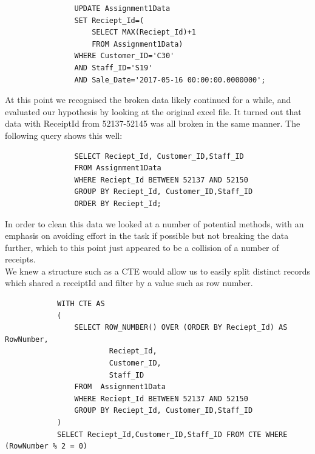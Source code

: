 \documentclass{article}
\begin{document}
            \begin{lstlisting}
                UPDATE Assignment1Data 
                SET Reciept_Id=(
                    SELECT MAX(Reciept_Id)+1 
                    FROM Assignment1Data) 
                WHERE Customer_ID='C30' 
                AND Staff_ID='S19' 
                AND Sale_Date='2017-05-16 00:00:00.0000000';
            \end{lstlisting}

            At this point we recognised the broken data likely continued for a while, and 
            evaluated our hypothesis by looking at the original excel file. It turned
            out that data with ReceiptId from 52137-52145 was all broken in the same manner.
            The following query shows this well:

            \begin{lstlisting}
                SELECT Reciept_Id, Customer_ID,Staff_ID 
                FROM Assignment1Data 
                WHERE Reciept_Id BETWEEN 52137 AND 52150
                GROUP BY Reciept_Id, Customer_ID,Staff_ID 
                ORDER BY Reciept_Id;
            \end{lstlisting}

            In order to clean this data we looked at a number of potential methods, with an 
            emphasis on avoiding effort in the task if possible but not breaking the data further,
            which to this point just appeared to be a collision of a number of receipts.
            \\
            We knew a structure such as a CTE\cite{CTE} would allow us to easily split
            distinct records which shared a receiptId and filter by a value such as row number.

            \begin{lstlisting}
            WITH CTE AS
            (
                SELECT ROW_NUMBER() OVER (ORDER BY Reciept_Id) AS RowNumber,
                        Reciept_Id,
                        Customer_ID,
                        Staff_ID
                FROM  Assignment1Data
                WHERE Reciept_Id BETWEEN 52137 AND 52150
                GROUP BY Reciept_Id, Customer_ID,Staff_ID 
            )
            SELECT Reciept_Id,Customer_ID,Staff_ID FROM CTE WHERE (RowNumber % 2 = 0)
            \end{lstlisting}
\end{document}
